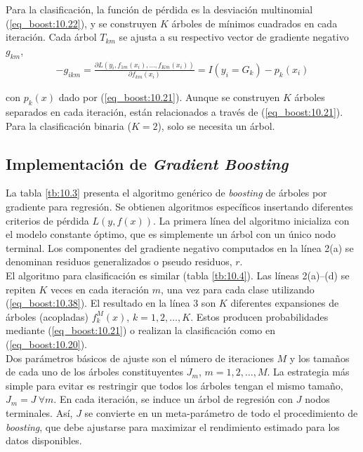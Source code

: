 Para la clasificación, la función de pérdida es la desviación multinomial (\ref{eq_boost:10.22}), y se construyen $K$ árboles de mínimos cuadrados en cada iteración. Cada árbol $T_{km}$ se ajusta a su respectivo vector de gradiente negativo $g_{km}$,
\begin{align}
-g_{ikm} = \frac{\partial L(y_i, f_{1m}(x_i), \dots, f_{Km}(x_i))}{\partial f_{km}(x_i)} = I(y_i = G_k) - p_k(x_i)
\label{eq_boost:10.38}
\end{align}

\noindent con $p_k(x)$ dado por (\ref{eq_boost:10.21}). Aunque se construyen $K$ árboles separados en cada iteración, están relacionados a través de (\ref{eq_boost:10.21}). Para la clasificación binaria ($K=2$), solo se necesita un árbol.

\subsection{Implementación de \textit{Gradient Boosting}}

La tabla \ref{tb:10.3} presenta el algoritmo genérico de \textit{boosting} de árboles por gradiente para regresión. Se obtienen algoritmos específicos insertando diferentes criterios de pérdida $L(y, f(x))$. La primera línea del algoritmo inicializa con el modelo constante óptimo, que es simplemente un árbol con un único nodo terminal. Los componentes del gradiente negativo computados en la línea 2(a) se denominan residuos generalizados o pseudo residuos, $r$. \\

El algoritmo para clasificación es similar (tabla \ref{tb:10.4}). Las líneas 2(a)–(d) se repiten $K$ veces en cada iteración $m$, una vez para cada clase utilizando (\ref{eq_boost:10.38}). El resultado en la línea 3 son $K$ diferentes expansiones de árboles (acopladas) $f_k^M(x)$, $k = 1, 2, \dots, K$. Estos producen probabilidades mediante (\ref{eq_boost:10.21}) o realizan la clasificación como en (\ref{eq_boost:10.20}). \\

Dos parámetros básicos de ajuste son el número de iteraciones $M$ y los tamaños de cada uno de los árboles constituyentes $J_m$, $m = 1, 2, \dots, M$. La estrategia más simple para evitar es restringir que todos los árboles tengan el mismo tamaño, $J_m = J \ \forall m$. En cada iteración, se induce un árbol de regresión con $J$ nodos terminales. Así, $J$ se convierte en un meta-parámetro de todo el procedimiento de \textit{boosting}, que debe ajustarse para maximizar el rendimiento estimado para los datos disponibles.

